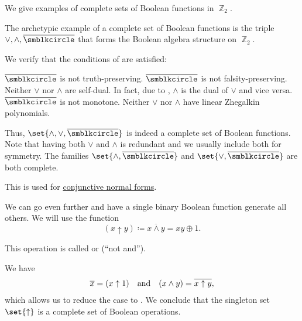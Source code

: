 \begin{example}\label{ex:posts_completeness_theorem}
  We give examples of complete sets of Boolean functions in \( \BbbZ_2 \).

  \begin{thmenum}
     The archetypic example of a complete set of Boolean functions is the triple \( \vee, \wedge, \overline{\anon} \) that forms the Boolean algebra structure on \( \BbbZ_2 \).

    We verify that the conditions of  are satisfied:
    \begin{refenum}
       \( \overline{\anon} \) is not truth-preserving.
       \( \overline{\anon} \) is not falsity-preserving.
       Neither \( \vee \) nor \( \wedge \) are self-dual. In fact, due to , \( \wedge \) is the dual of \( \vee \) and vice versa.
       \( \overline{\anon} \) is not monotone.
       Neither \( \vee \) nor \( \wedge \) have linear Zhegalkin polynomials.
    \end{refenum}

    Thus, \( \set{ \wedge, \vee, \overline{\anon} } \) is indeed a complete set of Boolean functions. Note that having both \( \vee \) and \( \wedge \) is redundant and we usually include both for symmetry. The families \( \set{ \wedge, \overline{\anon} } \) and \( \set{ \vee, \overline{\anon} } \) are both complete.

    This is used for \hyperref[alg:conjunctive_normal_form_reduction]{conjunctive normal forms}.

     We can go even further and have a single binary Boolean function generate all others. We will use the function
    \begin{equation}\label{eq:ex:posts_completeness_theorem/nand}
      (x \uparrow y) \coloneqq \overline{x \wedge y} = xy \oplus 1.
    \end{equation}

    This operation is called  or  (\enquote{not and}).

    We have
    \begin{equation*}
      \begin{array}{ccc}
        \overline{x} = (x \uparrow 1)
        &
        \T{and}
        &
        (x \wedge y) = \overline{x \uparrow y},
      \end{array}
    \end{equation*}
    which allows us to reduce the case to . We conclude that the singleton set \( \set{ \uparrow } \) is a complete set of Boolean operations.


\end{thmenum}
\end{example}
